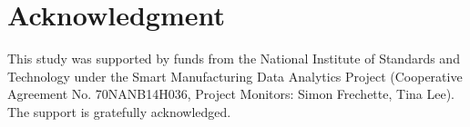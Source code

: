 \section*{Acknowledgment}

This study was supported by funds from the National Institute of Standards 
and Technology under the Smart Manufacturing Data Analytics Project 
(Cooperative Agreement No. 70NANB14H036, Project Monitors: Simon Frechette, 
Tina Lee). The support is gratefully acknowledged.
